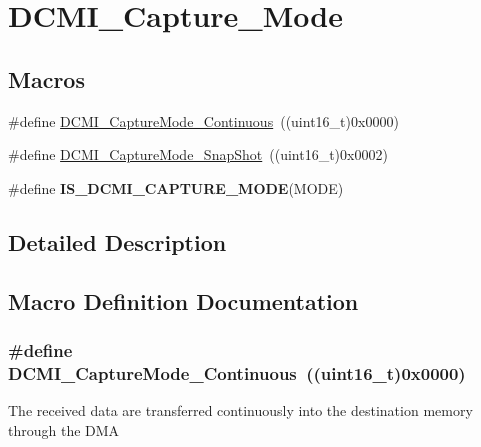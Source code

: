 \hypertarget{group___d_c_m_i___capture___mode}{\section{D\-C\-M\-I\-\_\-\-Capture\-\_\-\-Mode}
\label{group___d_c_m_i___capture___mode}
}
\subsection*{Macros}
\begin{DoxyCompactItemize}
\item 
\#define \hyperlink{group___d_c_m_i___capture___mode_gafc4b1ac09dcbc966fd0626d388b3e34b}{D\-C\-M\-I\-\_\-\-Capture\-Mode\-\_\-\-Continuous}~((uint16\-\_\-t)0x0000)
\item 
\#define \hyperlink{group___d_c_m_i___capture___mode_ga2be97e0095cc139fa20fe07a74c81fd0}{D\-C\-M\-I\-\_\-\-Capture\-Mode\-\_\-\-Snap\-Shot}~((uint16\-\_\-t)0x0002)
\item 
\#define {\bfseries I\-S\-\_\-\-D\-C\-M\-I\-\_\-\-C\-A\-P\-T\-U\-R\-E\-\_\-\-M\-O\-D\-E}(M\-O\-D\-E)
\end{DoxyCompactItemize}


\subsection{Detailed Description}


\subsection{Macro Definition Documentation}
\hypertarget{group___d_c_m_i___capture___mode_gafc4b1ac09dcbc966fd0626d388b3e34b}{
\subsubsection[{D\-C\-M\-I\-\_\-\-Capture\-Mode\-\_\-\-Continuous}]{\setlength{\rightskip}{0pt plus 5cm}\#define D\-C\-M\-I\-\_\-\-Capture\-Mode\-\_\-\-Continuous~((uint16\-\_\-t)0x0000)}}\label{group___d_c_m_i___capture___mode_gafc4b1ac09dcbc966fd0626d388b3e34b}
The received data are transferred continuously into the destination memory through the D\-M\-A 

